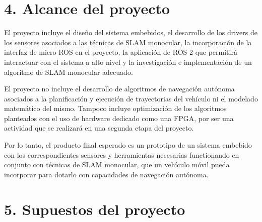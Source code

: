 \documentclass[
11pt, %
codirector, %
]{charter}
\begin{document}
\section{4. Alcance del proyecto}
\label{sec:alcance}






El proyecto incluye el diseño del sistema embebidos, el desarrollo de los drivers de los sensores asociados a las técnicas de SLAM monocular, la incorporación de la interfaz de micro-ROS en el proyecto, la aplicación de ROS 2 que permitirá interactuar con el sistema a alto nivel y la investigación e implementación de un algoritmo de SLAM monocular adecuado.

El proyecto no incluye el desarrollo de algoritmos de navegación autónoma asociados a la planificación y ejecución de trayectorias del vehículo ni el modelado matemático del mismo. Tampoco incluye optimización de los algoritmos planteados con el uso de hardware dedicado como una FPGA, por ser una actividad que se realizará en una segunda etapa del proyecto.

Por lo tanto, el producto final esperado es un prototipo de un sistema embebido con los correspondientes sensores y herramientas necesarias functionando en conjunto con técnicas de SLAM monocular, que un vehículo móvil pueda incorporar para dotarlo con capacidades de navegación autónoma.

\section{5. Supuestos del proyecto}
\label{sec:supuestos}


\end{document}
